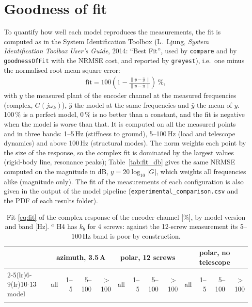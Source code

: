\documentclass[10pt,a4paper]{article}
\numberwithin{equation}{section}
\begin{document}
\section{Goodness of fit}\label{sec:fit}
To quantify how well each model reproduces the measurements, the fit is computed as in the System Identification Toolbox (L.~Ljung, \emph{System Identification Toolbox User's Guide}, 2014: ``Best Fit'', used by \texttt{compare} and by \texttt{goodnessOfFit} with the NRMSE cost, and reported by \texttt{greyest}), i.e.\ one minus the normalised root mean square error:
\begin{gather}
\mathrm{fit} = 100\left(1 - \frac{\lVert y - \hat y\rVert}{\lVert y - \bar y\rVert}\right)\ \%,\label{eq:fit}
\end{gather}
with $y$ the measured plant of the encoder channel at the measured frequencies (complex, $G(j\omega_k)$), $\hat y$ the model at the same frequencies and $\bar y$ the mean of $y$. 100\,\% is a perfect model, 0\,\% is no better than a constant, and the fit is negative when the model is worse than that. It is computed on all the measured points and in three bands: 1--5\,Hz (stiffness to ground), 5--100\,Hz (load and telescope dynamics) and above 100\,Hz (structural modes). The norm weights each point by the size of the response, so the complex fit is dominated by the largest values (rigid-body line, resonance peaks); Table~\ref{tab:fit_db} gives the same NRMSE computed on the magnitude in dB, $y = 20\log_{10}|G|$, which weights all frequencies alike (magnitude only). The fit of the measurements of each configuration is also given in the output of the model pipeline (\texttt{experimental\_comparison.csv} and the PDF of each results folder).
\begin{table}[H]\centering\scriptsize\setlength{\tabcolsep}{3pt}
\caption{Fit \eqref{eq:fit} of the complex response of the encoder channel [\%], by model version and band [Hz]. $^{a}$ H4 has $k_b$ for 4 screws: against the 12-screw measurement its 5--100\,Hz band is poor by construction.}\label{tab:fit_complex}
\begin{tabular}{lrrrrrrrrrrrr}\toprule
& \multicolumn{4}{c}{azimuth, 3.5\,A} & \multicolumn{4}{c}{polar, 12 screws} & \multicolumn{4}{c}{polar, no telescope} \\ \cmidrule(lr){2-5}\cmidrule(lr){6-9}\cmidrule(lr){10-13}
model & all & 1--5 & 5--100 & $>$100 & all & 1--5 & 5--100 & $>$100 & all & 1--5 & 5--100 & $>$100 \\ \midrule
\\ \bottomrule
\end{tabular}\end{table}
\end{document}
